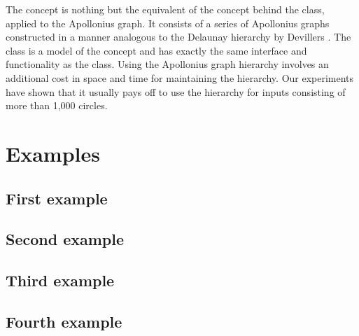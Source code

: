 The  concept is nothing but the
equivalent of the concept behind the 
class, applied to the
Apollonius graph. It consists of a series of Apollonius graphs
constructed in a manner analogous to the Delaunay hierarchy by
Devillers \cite{d-iirdt-98}. The class
is a model of the  concept and has
exactly the same interface and functionality as the
class. Using the Apollonius graph hierarchy involves an additional
cost in space and time for maintaining the hierarchy. Our experiments
have shown that it usually pays off to use the hierarchy for inputs
consisting of more than 1,000 circles.


\section{Examples}
\label{sec:apollonius2-examples}

\subsection{First example}

\subsection{Second example}

\subsection{Third example}

\subsection{Fourth example}
